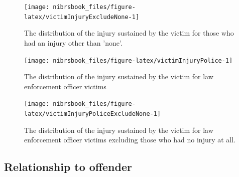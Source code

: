 \documentclass[
  12pt,
  openany]{book}
\begin{document}
\begin{figure}

{\centering \texttt{[image: nibrsbook\_files/figure-latex/victimInjuryExcludeNone-1]} 

}

\caption{The distribution of the injury sustained by the victim for those who had an injury other than 'none'.}\label{fig:victimInjuryExcludeNone}
\end{figure}

\begin{figure}

{\centering \texttt{[image: nibrsbook\_files/figure-latex/victimInjuryPolice-1]} 

}

\caption{The distribution of the injury sustained by the victim for law enforcement officer victims}\label{fig:victimInjuryPolice}
\end{figure}

\begin{figure}

{\centering \texttt{[image: nibrsbook\_files/figure-latex/victimInjuryPoliceExcludeNone-1]} 

}

\caption{The distribution of the injury sustained by the victim for law enforcement officer victims excluding those who had no injury at all.}\label{fig:victimInjuryPoliceExcludeNone}
\end{figure}

\hypertarget{relationship-to-offender}{%
\subsection{Relationship to offender}\label{relationship-to-offender}}
\end{document}
